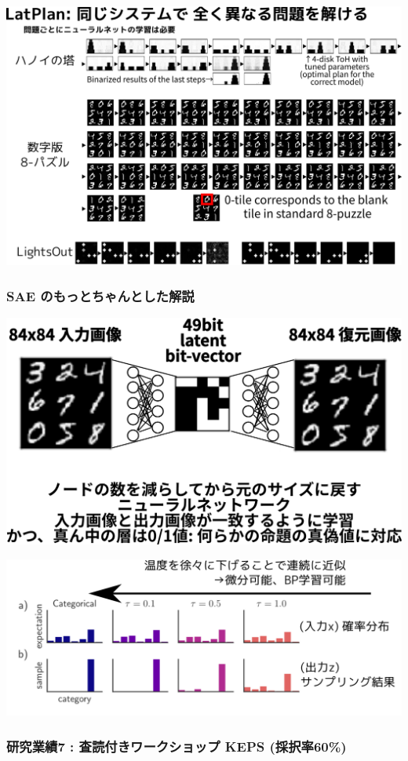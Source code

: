 \includegraphics{img/keps17-2.png}

\subsubsection{SAE のもっとちゃんとした解説}
\label{sec-2-4-2}

\includegraphics{img/sae/state-ae.png}

\includegraphics{img/sae/gumbel.png}

\subsubsection{研究業績7 : 査読付きワークショップ KEPS (採択率60\%)}
\label{sec-2-4-3}

